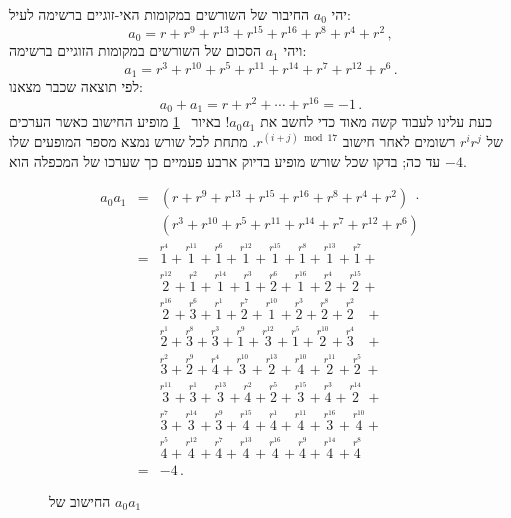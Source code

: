 \documentclass[11pt,a4paper]{article}
\newenvironment{form}[1]{%
\begin{displaymath}%
\renewcommand{\arraystretch}{#1}%
\begin{array}{lcl}}%
{\end{array}%
\end{displaymath}%
}
\newcommand*{\occ}[2]{%
  \stackrel{%
    \textstyle r^{#1}}%
    {\!\!\!\scriptscriptstyle #2}}
\begin{document}
יהי
$a_0$
החיבור של השורשים במקומות האי-זוגיים ברשימה לעיל:
\[
a_0=r + r^9 + r^{13} +r^{15} +r^{16} + r^8+r^4+r^2\,,
\]
ויהי
$a_1$
הסכום של השורשים במקומות הזוגיים ברשימה:
\[
a_1=r^3 + r^{10} + r^{5} +r^{11} +r^{14} + r^7+r^{12}+r^6\,.
\]
לפי תוצאה שכבר מצאנו:
\[
a_0+a_1=r + r^2 + \cdots +r^{16}=-1\,.
\]
כעת עלינו לעבוד קשה מאוד כדי לחשב את
$a_0a_1$!
באיור%
~\ref{fig.a0a1}
מופיע החישוב כאשר הערכים של
$r^ir^j$
רשומים לאחר חישוב
$r^{(i+j) \bmod 17}$.
מתחת לכל שורש נמצא מספר המופעים שלו עד כה;
בדקו שכל שורש מופיע בדיוק ארבע פעמיים כך שערכו של המכפלה הוא 
$-4$.
\begin{figure}[tb]
\begin{form}{1.5}
a_0a_1&=&(r + r^9 + r^{13} +r^{15} +r^{16} + r^8+r^4+r^2)\;\cdot\\
&&(r^3 + r^{10} + r^{5} +r^{11} +r^{14} + r^7+r^{12}+r^6)\\
&=&\occ{4}{1} + \occ{11}{1} + \occ{6}{1} + \occ{12}{1} + \occ{15}{1} + \occ{8}{1} + \occ{13}{1} + \occ{7}{1} +\\

&&\occ{12}{2} + \occ{2}{1} + \occ{14}{1} + \occ{3}{1} + \occ{6}{2} + \occ{16}{1} + \occ{4}{2} + \occ{15}{2} +\\

&&\occ{16}{2} + \occ{6}{3} + \occ{1}{1} + \occ{7}{2} + \occ{10}{1} + \occ{3}{2} + \occ{8}{2} + \occ{2}{2}\;\;\: +\\

&&\occ{1}{2} + \occ{8}{3} + \occ{3}{3} + \occ{9}{1} + \occ{12}{3} + \occ{5}{1} + \occ{10}{2} + \occ{4}{3}\;\;\: +\\

&&\occ{2}{3} + \occ{9}{2} + \occ{4}{4} + \occ{10}{3} + \occ{13}{2} + \occ{10}{4} + \occ{11}{2} + \occ{5}{2} \:+\\

&&\occ{11}{3} + \occ{1}{3} + \occ{13}{3} + \occ{2}{4} + \occ{5}{2} + \occ{15}{3} + \occ{3}{4} + \occ{14}{2} \;+\\

&&\occ{7}{3} + \occ{14}{3} + \occ{9}{3} + \occ{15}{4} + \occ{1}{4} + \occ{11}{4} + \occ{16}{3} + \occ{10}{4} +\\

&&\occ{5}{4} + \occ{12}{4} + \occ{7}{4} + \occ{13}{4} + \occ{16}{4} + \occ{9}{4} + \occ{14}{4} + \occ{8}{4}\\
&=&-4\,.
\end{form}\vspace{-2em}
\caption{החישוב של $a_0a_1$}\label{fig.a0a1}
\end{figure}
\end{document}
